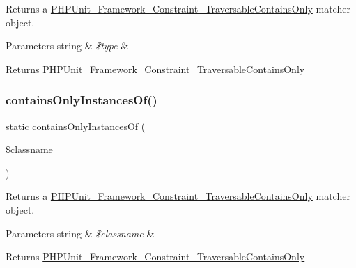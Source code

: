 Returns a \mbox{\hyperlink{class_p_h_p_unit___framework___constraint___traversable_contains_only}{P\+H\+P\+Unit\+\_\+\+Framework\+\_\+\+Constraint\+\_\+\+Traversable\+Contains\+Only}} matcher object.


\begin{DoxyParams}[1]{Parameters}
string & {\em \$type} & \\
\hline
\end{DoxyParams}
\begin{DoxyReturn}{Returns}
\mbox{\hyperlink{class_p_h_p_unit___framework___constraint___traversable_contains_only}{P\+H\+P\+Unit\+\_\+\+Framework\+\_\+\+Constraint\+\_\+\+Traversable\+Contains\+Only}} 
\end{DoxyReturn}
\mbox{\label{class_p_h_p_unit___framework___assert_a548b929c8c7787b9719a3911dd7eaa4a}} 
\subsubsection{\texorpdfstring{contains\+Only\+Instances\+Of()}{containsOnlyInstancesOf()}}
{\footnotesize\ttfamily static contains\+Only\+Instances\+Of (\begin{DoxyParamCaption}\item[{}]{\$classname }\end{DoxyParamCaption})\hspace{0.3cm}{\ttfamily [static]}}

Returns a \mbox{\hyperlink{class_p_h_p_unit___framework___constraint___traversable_contains_only}{P\+H\+P\+Unit\+\_\+\+Framework\+\_\+\+Constraint\+\_\+\+Traversable\+Contains\+Only}} matcher object.


\begin{DoxyParams}[1]{Parameters}
string & {\em \$classname} & \\
\hline
\end{DoxyParams}
\begin{DoxyReturn}{Returns}
\mbox{\hyperlink{class_p_h_p_unit___framework___constraint___traversable_contains_only}{P\+H\+P\+Unit\+\_\+\+Framework\+\_\+\+Constraint\+\_\+\+Traversable\+Contains\+Only}} 
\end{DoxyReturn}
\mbox{\label{class_p_h_p_unit___framework___assert_acb4d3e3212f0877aaa5366d381ac3d92}} 
